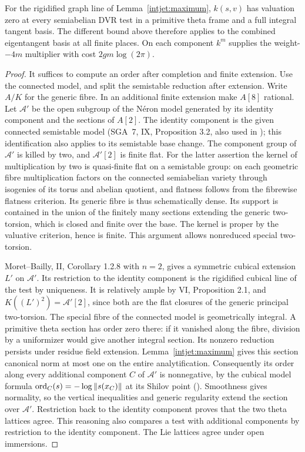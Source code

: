 \begin{theorem}\label{ctwist:semi}
For the rigidified graph line of Lemma~\ref{intjet:maximum},
\(k(s,v)\) has valuation zero at every semiabelian DVR test in
a primitive theta frame and a full integral tangent basis. The
different bound above therefore applies to the combined eigentangent
basis at all finite places. On each component \(k^m\) supplies the
weight-\(-4m\) multiplier with cost \(2gm\log(2\pi)\).
\end{theorem}
\begin{proof}
It suffices to compute an order after completion and finite
extension. Use the connected model, and split the semistable
reduction after extension. Write \(A/K\) for the generic fibre.
In an additional finite extension make \(A[8]\) rational. Let
\(\mathcal A'\) be the open subgroup of the Néron model generated
by its identity component and the sections of \(A[2]\).
The identity component is the given connected semistable model
(SGA~7, IX, Proposition 3.2, also used in
\cite[IV, \S3.4]{moret-bailly-pinceaux}); this identification
also applies to its semistable base change. The component group
of \(\mathcal A'\) is killed by two, and
\(\mathcal A'[2]\) is finite flat. For the latter assertion the
kernel of multiplication by two is quasi-finite flat on a
semistable group: on each geometric fibre multiplication factors
on the connected semiabelian variety through isogenies of its
torus and abelian quotient, and flatness follows from the
fibrewise flatness criterion. Its generic fibre is thus
schematically dense. Its support is contained in the union of
the finitely many sections extending the generic two-torsion,
which is closed and finite over the base. The kernel is proper
by the valuative criterion, hence is finite. This argument allows
nonreduced special two-torsion.

Moret--Bailly, II, Corollary 1.2.8 with \(n=2\), gives a symmetric
cubical extension \(L'\) on \(\mathcal A'\). Its restriction to
the identity component is the rigidified cubical line of the
test by uniqueness. It is relatively ample by VI, Proposition
2.1, and \(K((L')^2)=\mathcal A'[2]\), since both are the flat
closures of the generic principal two-torsion. The special
fibre of the connected model is geometrically integral. A
primitive theta section has order zero there: if it vanished
along the fibre, division by a uniformizer would give another
integral section. Its nonzero reduction persists under residue
field extension. Lemma~\ref{intjet:maximum} gives this section
canonical norm at most one on the entire analytification.
Consequently its order along every additional component \(C\)
of \(\mathcal A'\) is nonnegative, by the cubical model formula
\({\rm ord}_C(s)=-\log\|s(x_C)\|\) at its Shilov point
(\cite[Proposition 10.3]{deJongShokrieh}). Smoothness gives
normality, so the vertical inequalities and generic regularity
extend the section over \(\mathcal A'\). Restriction back to the
identity component proves that the two theta lattices agree.
This reasoning also compares a test with additional components
by restriction to the identity component. The Lie lattices agree
under open immersions.


\end{proof}
